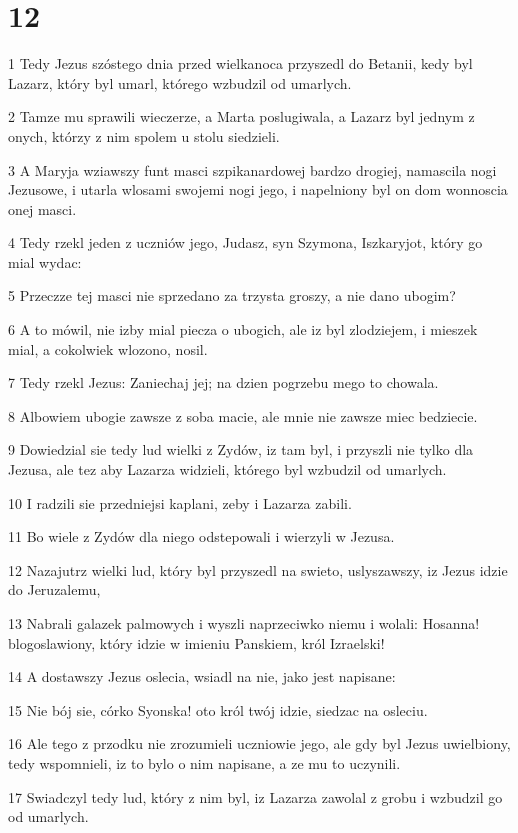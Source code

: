 \chapter{12}

\par 1 Tedy Jezus szóstego dnia przed wielkanoca przyszedl do Betanii, kedy byl Lazarz, który byl umarl, którego wzbudzil od umarlych.
\par 2 Tamze mu sprawili wieczerze, a Marta poslugiwala, a Lazarz byl jednym z onych, którzy z nim spolem u stolu siedzieli.
\par 3 A Maryja wziawszy funt masci szpikanardowej bardzo drogiej, namascila nogi Jezusowe, i utarla wlosami swojemi nogi jego, i napelniony byl on dom wonnoscia onej masci.
\par 4 Tedy rzekl jeden z uczniów jego, Judasz, syn Szymona, Iszkaryjot, który go mial wydac:
\par 5 Przeczze tej masci nie sprzedano za trzysta groszy, a nie dano ubogim?
\par 6 A to mówil, nie izby mial piecza o ubogich, ale iz byl zlodziejem, i mieszek mial, a cokolwiek wlozono, nosil.
\par 7 Tedy rzekl Jezus: Zaniechaj jej; na dzien pogrzebu mego to chowala.
\par 8 Albowiem ubogie zawsze z soba macie, ale mnie nie zawsze miec bedziecie.
\par 9 Dowiedzial sie tedy lud wielki z Zydów, iz tam byl, i przyszli nie tylko dla Jezusa, ale tez aby Lazarza widzieli, którego byl wzbudzil od umarlych.
\par 10 I radzili sie przedniejsi kaplani, zeby i Lazarza zabili.
\par 11 Bo wiele z Zydów dla niego odstepowali i wierzyli w Jezusa.
\par 12 Nazajutrz wielki lud, który byl przyszedl na swieto, uslyszawszy, iz Jezus idzie do Jeruzalemu,
\par 13 Nabrali galazek palmowych i wyszli naprzeciwko niemu i wolali: Hosanna! blogoslawiony, który idzie w imieniu Panskiem, król Izraelski!
\par 14 A dostawszy Jezus oslecia, wsiadl na nie, jako jest napisane:
\par 15 Nie bój sie, córko Syonska! oto król twój idzie, siedzac na osleciu.
\par 16 Ale tego z przodku nie zrozumieli uczniowie jego, ale gdy byl Jezus uwielbiony, tedy wspomnieli, iz to bylo o nim napisane, a ze mu to uczynili.
\par 17 Swiadczyl tedy lud, który z nim byl, iz Lazarza zawolal z grobu i wzbudzil go od umarlych.

